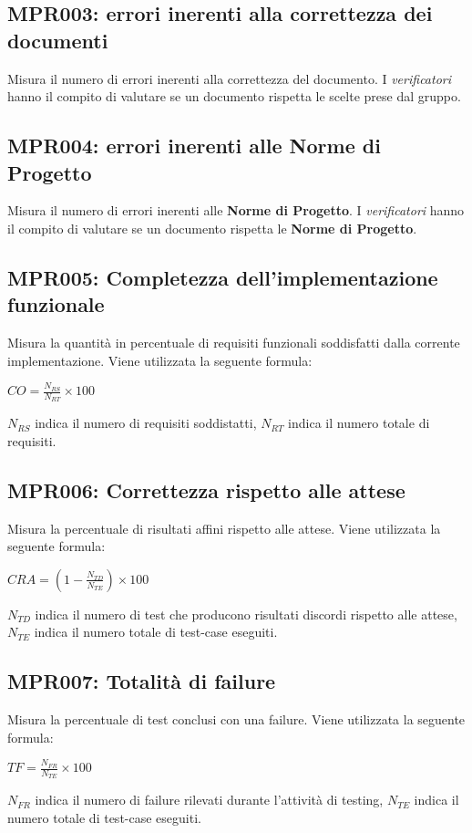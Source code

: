 \subsection{MPR003: errori inerenti alla correttezza dei documenti}
Misura il numero di errori inerenti alla correttezza del documento. I \textit{verificatori} hanno il compito di valutare se un documento rispetta le scelte prese dal gruppo.

\subsection{MPR004: errori inerenti alle Norme di Progetto}
Misura il numero di errori inerenti alle \textbf{Norme di Progetto}. I \textit{verificatori} hanno il compito di valutare se un documento rispetta le \textbf{Norme di Progetto}.


\subsection{MPR005: Completezza dell'implementazione funzionale}
Misura la quantità in percentuale di requisiti funzionali soddisfatti dalla corrente implementazione. Viene utilizzata la seguente formula: 
\begin{center}{$CO=\frac{N_{RS}}{N_{RT}}\times 100$}\end{center}
$N_{RS}$  indica il numero di requisiti soddistatti, $N_{RT}$  indica il numero totale di requisiti.

\subsection{MPR006: Correttezza  rispetto alle attese}
Misura la percentuale di risultati affini rispetto alle attese. Viene utilizzata la seguente formula:
\begin{center}{$CRA=(1-\frac{N_{TD}}{N_{TE}})\times 100$}\end{center}
${N_{TD}}$ indica il numero di test che producono risultati discordi rispetto alle attese, ${N_{TE}}$ indica il numero totale di test-case eseguiti.

\subsection{MPR007: Totalità di failure}
Misura la percentuale di test conclusi con una failure. Viene utilizzata la seguente formula:
\begin{center}{$TF=\frac{N_{FR}}{N_{TE}}\times 100$}\end{center}
${N_{FR}}$ indica il numero di failure rilevati durante l'attività di testing,
${N_{TE}}$ indica il numero totale di test-case eseguiti.

